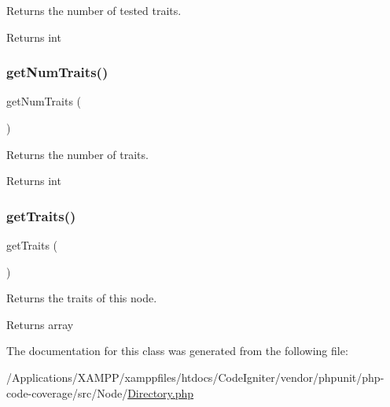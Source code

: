Returns the number of tested traits.

\begin{DoxyReturn}{Returns}
int 
\end{DoxyReturn}
\mbox{\label{class_sebastian_bergmann_1_1_code_coverage_1_1_node_1_1_directory_a8b1689472c8328bd77d2133c0d8f3c19}} 
\subsubsection{\texorpdfstring{get\+Num\+Traits()}{getNumTraits()}}
{\footnotesize\ttfamily get\+Num\+Traits (\begin{DoxyParamCaption}{ }\end{DoxyParamCaption})}

Returns the number of traits.

\begin{DoxyReturn}{Returns}
int 
\end{DoxyReturn}
\mbox{\label{class_sebastian_bergmann_1_1_code_coverage_1_1_node_1_1_directory_a8985442e8133cd567bf7ce548f96561f}} 
\subsubsection{\texorpdfstring{get\+Traits()}{getTraits()}}
{\footnotesize\ttfamily get\+Traits (\begin{DoxyParamCaption}{ }\end{DoxyParamCaption})}

Returns the traits of this node.

\begin{DoxyReturn}{Returns}
array 
\end{DoxyReturn}


The documentation for this class was generated from the following file\+:\begin{DoxyCompactItemize}
\item 
/\+Applications/\+X\+A\+M\+P\+P/xamppfiles/htdocs/\+Code\+Igniter/vendor/phpunit/php-\/code-\/coverage/src/\+Node/\mbox{\hyperlink{_node_2_directory_8php}{Directory.\+php}}\end{DoxyCompactItemize}
